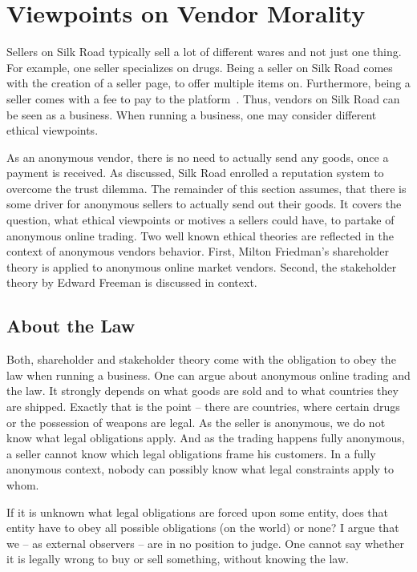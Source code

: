 \section{Viewpoints on Vendor Morality}
\label{vendors}

Sellers on Silk Road typically sell a lot of different wares and not just one thing. For example, one seller specializes on drugs. Being a seller on Silk Road comes with the creation of a seller page, to offer multiple items on. Furthermore, being a seller comes with a fee to pay to the platform~\cite{silkroad2013}. Thus, vendors on Silk Road can be seen as a business. When running a business, one may consider different ethical viewpoints.

As an anonymous vendor, there is no need to actually send any goods, once a payment is received. As discussed, Silk Road enrolled a reputation system to overcome the trust dilemma. The remainder of this section assumes, that there is some driver for anonymous sellers to actually send out their goods. It covers the question, what ethical viewpoints or motives a sellers could have, to partake of anonymous online trading. Two well known ethical theories are reflected in the context of anonymous vendors behavior. First, Milton Friedman's shareholder theory \cite{shareholder} is applied to anonymous online market vendors. Second, the stakeholder theory by Edward Freeman \cite{stakeholder} is discussed in context.

\subsection{About the Law}

Both, shareholder and stakeholder theory come with the obligation to obey the law when running a business\cite{shareholder, stakeholder}. One can argue about anonymous online trading and the law. It strongly depends on what goods are sold and to what countries they are shipped. Exactly that is the point -- there are countries, where certain drugs or the possession of weapons are legal. As the seller is anonymous, we do not know what legal obligations apply. And as the trading happens fully anonymous, a seller cannot know which legal obligations frame his customers. In a fully anonymous context, nobody can possibly know what legal constraints apply to whom.

If it is unknown what legal obligations are forced upon some entity, does that entity have to obey all possible obligations (on the world) or none? I argue that we -- as external observers -- are in no position to judge. One cannot say whether it is legally wrong to buy or sell something, without knowing the law.

